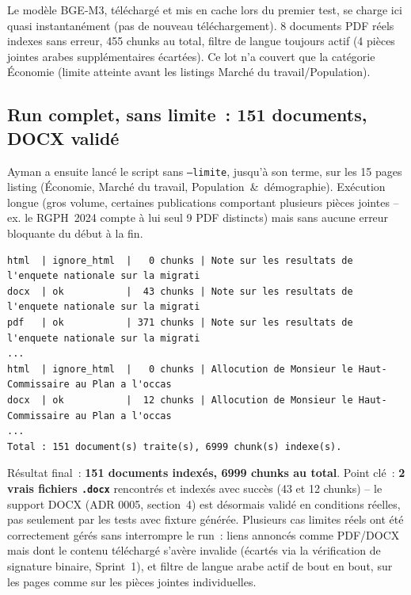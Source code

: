 \documentclass[11pt,a4paper]{article}
\begin{document}
Le mod\`ele BGE-M3, t\'el\'echarg\'e et mis en cache lors du premier test, se charge ici quasi instantan\'ement (pas de nouveau t\'el\'echargement). 8 documents PDF r\'eels indexes sans erreur, 455 chunks au total, filtre de langue toujours actif (4 pi\`eces jointes arabes suppl\'ementaires \'ecart\'ees). Ce lot n'a couvert que la cat\'egorie \'Economie (limite atteinte avant les listings Marché du travail/Population).

\subsection{Run complet, sans limite~: 151 documents, DOCX valid\'e}
Ayman a ensuite lanc\'e le script sans \texttt{--limite}, jusqu'\`a son terme, sur les 15 pages listing (\'Economie, March\'e du travail, Population~\&~d\'emographie). Ex\'ecution longue (gros volume, certaines publications comportant plusieurs pi\`eces jointes -- ex. le RGPH~2024 compte \`a lui seul 9 PDF distincts) mais sans aucune erreur bloquante du d\'ebut \`a la fin.

\begin{terminal}[title={PS> python -m scripts.indexer\_documents \ \ (extrait de fin de run)}]
\begin{Verbatim}
html  | ignore_html  |   0 chunks | Note sur les resultats de l'enquete nationale sur la migrati
docx  | ok           |  43 chunks | Note sur les resultats de l'enquete nationale sur la migrati
pdf   | ok           | 371 chunks | Note sur les resultats de l'enquete nationale sur la migrati
...
html  | ignore_html  |   0 chunks | Allocution de Monsieur le Haut-Commissaire au Plan a l'occas
docx  | ok           |  12 chunks | Allocution de Monsieur le Haut-Commissaire au Plan a l'occas
...
Total : 151 document(s) traite(s), 6999 chunk(s) indexe(s).
\end{Verbatim}
\end{terminal}

R\'esultat final~: \textbf{151 documents index\'es, 6999 chunks au total}. Point cl\'e~: \textbf{2 vrais fichiers \texttt{.docx}} rencontr\'es et index\'es avec succ\`es (43 et 12 chunks) -- le support DOCX (ADR 0005, section~4) est d\'esormais valid\'e en conditions r\'eelles, pas seulement par les tests avec fixture g\'en\'er\'ee. Plusieurs cas limites r\'eels ont \'et\'e correctement g\'er\'es sans interrompre le run~: liens annonc\'es comme PDF/DOCX mais dont le contenu t\'el\'echarg\'e s'av\`ere invalide (\'ecart\'es via la v\'erification de signature binaire, Sprint~1), et filtre de langue arabe actif de bout en bout, sur les pages comme sur les pi\`eces jointes individuelles.
\end{document}
